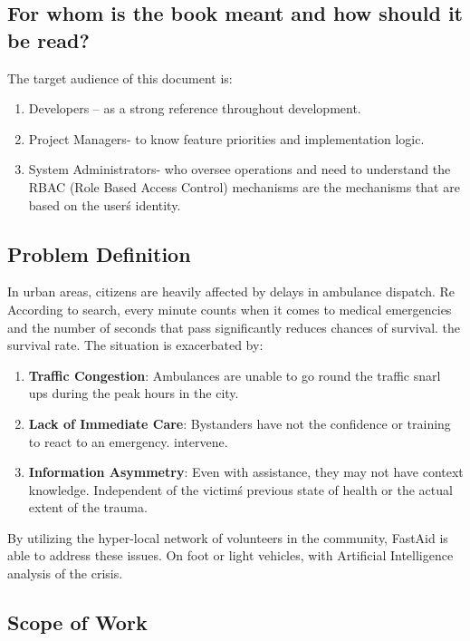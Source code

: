 \documentclass[12pt,a4paper]{article}
\begin{document}
\subsection{For whom is the book meant and how should it be read?}
The target audience of this document is:
\begin{enumerate}[leftmargin=2em]
  \item Developers – as a strong reference throughout development.
  \item Project Managers- to know feature priorities and implementation logic.
  \item System Administrators- who oversee operations and need to understand the RBAC (Role Based Access Control) mechanisms are the mechanisms that are based on the user\'s identity.
\end{enumerate}

\subsection{Problem Definition}
In urban areas, citizens are heavily affected by delays in ambulance dispatch. Re According to search, every minute counts when it comes to medical emergencies and the number of seconds that pass significantly reduces chances of survival. the survival rate. The situation is exacerbated by:
\begin{enumerate}[leftmargin=2em]
  \item \textbf{Traffic Congestion}: Ambulances are unable to go round the traffic snarl ups during the peak hours in the city.
  \item \textbf{Lack of Immediate Care}: Bystanders have not the confidence or training to react to an emergency. intervene.
  \item \textbf{Information Asymmetry}: Even with assistance, they may not have context knowledge. Independent of the victim\'s previous state of health or the actual extent of the trauma.
\end{enumerate}
By utilizing the hyper-local network of volunteers in the community, FastAid is able to address these issues. On foot or light vehicles, with Artificial Intelligence analysis of the crisis.

\subsection{Scope of Work}
\end{document}
